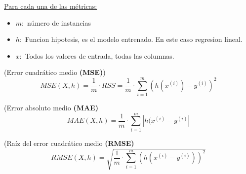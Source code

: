 \documentclass[../main.tex]{subfiles}
\begin{document}
        \underline{Para cada una de las métricas:}
        \begin{itemize}
            \item $m:$ número de instancias
            \item $h:$ Funcion hipotesis, es el modelo entrenado. En este caso regresion lineal.
            \item $x:$ Todos los valores de entrada, todas las columnas.
        \end{itemize}
        
        \begin{definition} (Error cuadrático medio \textbf{(MSE)})
            \begin{equation}
                MSE(X, h) = \frac{1}{m} \cdot RSS = \frac{1}{m} \cdot \sum_{i=1}^{m} (h(x^{(i)}) - y^{(i)})^2
            \end{equation}
        \end{definition}
        
        \begin{definition} (Error absoluto medio \textbf{(MAE)}
            \begin{equation}
                MAE(X, h) = \frac{1}{m} \cdot \sum_{i=1}^{m} |h(x^{(i)} - y^{(i)}|
            \end{equation}
        \end{definition}

        \begin{definition} (Raíz del error cuadrático medio \textbf{(RMSE)}
            \begin{equation}
                RMSE(X, h) = \sqrt{\frac{1}{m} \cdot \sum_{i=1}^{m}(h(x^{(i)}-y^{(i)}))^2}
            \end{equation} 
        \end{definition}


		          
\end{document}

